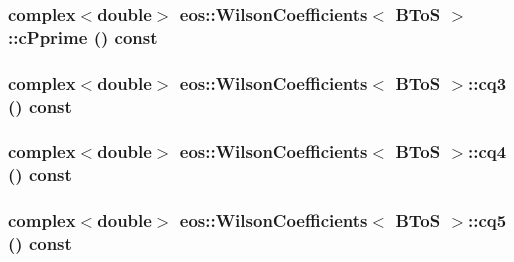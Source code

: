 \label{structeos_1_1WilsonCoefficients_3_01BToS_01_4_af5e99da02e53255077cdf53b315c0960}
\hypertarget{structeos_1_1WilsonCoefficients_3_01BToS_01_4_ab49d57e926919ae28d0780f8d9df644b}{
\subsubsection[{cPprime}]{\setlength{\rightskip}{0pt plus 5cm}complex$<$double$>$ eos::WilsonCoefficients$<$ {\bf BToS} $>$::cPprime () const}}
\label{structeos_1_1WilsonCoefficients_3_01BToS_01_4_ab49d57e926919ae28d0780f8d9df644b}
\hypertarget{structeos_1_1WilsonCoefficients_3_01BToS_01_4_aac9632c45e186951fe0459cb315dee0e}{
\subsubsection[{cq3}]{\setlength{\rightskip}{0pt plus 5cm}complex$<$double$>$ eos::WilsonCoefficients$<$ {\bf BToS} $>$::cq3 () const}}
\label{structeos_1_1WilsonCoefficients_3_01BToS_01_4_aac9632c45e186951fe0459cb315dee0e}
\hypertarget{structeos_1_1WilsonCoefficients_3_01BToS_01_4_a4e0045b6ae96dd094b9e21450fcebce2}{
\subsubsection[{cq4}]{\setlength{\rightskip}{0pt plus 5cm}complex$<$double$>$ eos::WilsonCoefficients$<$ {\bf BToS} $>$::cq4 () const}}
\label{structeos_1_1WilsonCoefficients_3_01BToS_01_4_a4e0045b6ae96dd094b9e21450fcebce2}
\hypertarget{structeos_1_1WilsonCoefficients_3_01BToS_01_4_a73655ba58242bc15ecc8f097ec9abadd}{
\subsubsection[{cq5}]{\setlength{\rightskip}{0pt plus 5cm}complex$<$double$>$ eos::WilsonCoefficients$<$ {\bf BToS} $>$::cq5 () const}}
